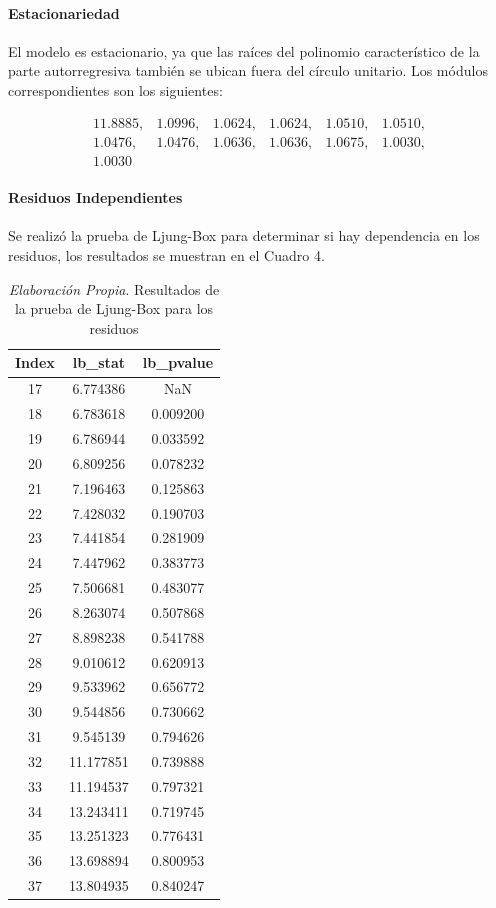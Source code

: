 \documentclass[12pt,letterpaper]{article}   %
\begin{document}
\paragraph{Estacionariedad}
El modelo es estacionario, ya que las raíces del polinomio característico de la parte autorregresiva también se ubican fuera del círculo unitario. Los módulos correspondientes son los siguientes:

\[
\begin{array}{cccccc}
11.8885, & 1.0996, & 1.0624, & 1.0624, & 1.0510, & 1.0510, \\
1.0476, & 1.0476, & 1.0636, & 1.0636, & 1.0675, & 1.0030, \\
1.0030
\end{array}
\]

\paragraph{Residuos Independientes}
Se realizó la prueba de Ljung-Box para determinar si hay dependencia en los residuos, los resultados se muestran en el Cuadro 4.
\begin{table}[ht]
\footnotesize
\centering
\begin{tabular}{ccc}
\hline
\textbf{Index} & \textbf{lb\_stat} & \textbf{lb\_pvalue} \\
\hline
17 & 6.774386 & NaN \\
18 & 6.783618 & 0.009200 \\
19 & 6.786944 & 0.033592 \\
20 & 6.809256 & 0.078232 \\
21 & 7.196463 & 0.125863 \\
22 & 7.428032 & 0.190703 \\
23 & 7.441854 & 0.281909 \\
24 & 7.447962 & 0.383773 \\
25 & 7.506681 & 0.483077 \\
26 & 8.263074 & 0.507868 \\
27 & 8.898238 & 0.541788 \\
28 & 9.010612 & 0.620913 \\
29 & 9.533962 & 0.656772 \\
30 & 9.544856 & 0.730662 \\
31 & 9.545139 & 0.794626 \\
32 & 11.177851 & 0.739888 \\
33 & 11.194537 & 0.797321 \\
34 & 13.243411 & 0.719745 \\
35 & 13.251323 & 0.776431 \\
36 & 13.698894 & 0.800953 \\
37 & 13.804935 & 0.840247 \\
\hline
\end{tabular}
\caption{\textit{Elaboración Propia}. Resultados de la prueba de Ljung-Box para los residuos}
\end{table}
\end{document}
